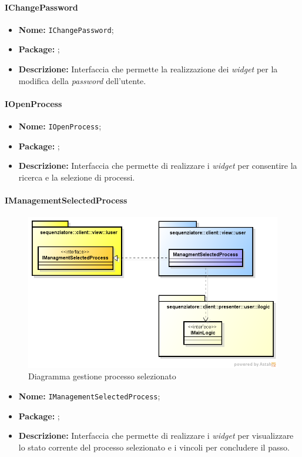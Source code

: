 \paragraph{IChangePassword}
\begin{itemize}
\item \textbf{Nome:} \texttt{IChangePassword};
\item \textbf{Package:} \texttt{\iViewUser{}};
\item \textbf{Descrizione:} Interfaccia che permette la realizzazione dei \textit{widget} per la modifica della \textit{password} dell'utente.
\end{itemize}

\paragraph{IOpenProcess}
\begin{itemize}
\item \textbf{Nome:} \texttt{IOpenProcess};
\item \textbf{Package:} \texttt{\iViewUser{}};
\item \textbf{Descrizione:} Interfaccia che permette di realizzare i \textit{widget} per consentire la ricerca e la selezione di processi.
\end{itemize}

\paragraph{IManagementSelectedProcess}
\begin{figure}[H] \centering \includegraphics[width=%
\textwidth]
{./pack/ManagmentSelectedProcess.png} \caption{Diagramma gestione processo selezionato}
\end{figure}
\begin{itemize}
\item \textbf{Nome:} \texttt{IManagementSelectedProcess};
\item \textbf{Package:} \texttt{\iViewUser{}};
\item \textbf{Descrizione:} Interfaccia che permette di realizzare i \textit{widget} per visualizzare lo stato corrente del processo selezionato e i vincoli per concludere il passo.
\end{itemize}

